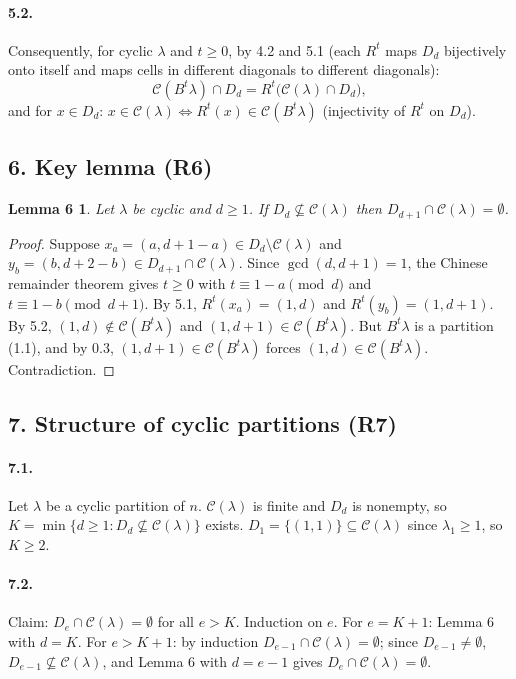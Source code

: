 \documentclass[11pt]{article}
\newtheorem*{lemmasix}{Lemma 6}
\begin{document}
\paragraph{5.2.} Consequently, for cyclic $\lambda$ and $t\ge0$, by 4.2 and 5.1 (each $R^t$ maps $D_d$
bijectively onto itself and maps cells in different diagonals to different diagonals):
\[
\mathcal C(B^t\lambda)\cap D_d=R^t\bigl(\mathcal C(\lambda)\cap D_d\bigr),
\]
and for $x\in D_d$: $x\in\mathcal C(\lambda)\iff R^t(x)\in\mathcal C(B^t\lambda)$ (injectivity of $R^t$ on $D_d$).

\subsection*{6. Key lemma (R6)}

\begin{lemmasix}
Let $\lambda$ be cyclic and $d\ge1$. If $D_d\not\subseteq\mathcal C(\lambda)$ then
$D_{d+1}\cap\mathcal C(\lambda)=\emptyset$.
\end{lemmasix}

\begin{proof}
Suppose $x_a=(a,d+1-a)\in D_d\setminus\mathcal C(\lambda)$ and $y_b=(b,d+2-b)\in D_{d+1}\cap\mathcal C(\lambda)$.
Since $\gcd(d,d+1)=1$, the Chinese remainder theorem gives $t\ge0$ with $t\equiv1-a\pmod d$ and
$t\equiv1-b\pmod{d+1}$. By 5.1, $R^t(x_a)=(1,d)$ and $R^t(y_b)=(1,d+1)$. By 5.2,
$(1,d)\notin\mathcal C(B^t\lambda)$ and $(1,d+1)\in\mathcal C(B^t\lambda)$. But $B^t\lambda$ is a partition (1.1),
and by 0.3, $(1,d+1)\in\mathcal C(B^t\lambda)$ forces $(1,d)\in\mathcal C(B^t\lambda)$. Contradiction.
\end{proof}

\subsection*{7. Structure of cyclic partitions (R7)}

\paragraph{7.1.} Let $\lambda$ be a cyclic partition of $n$. $\mathcal C(\lambda)$ is finite and $D_d$ is
nonempty, so $K=\min\{d\ge1: D_d\not\subseteq\mathcal C(\lambda)\}$ exists. $D_1=\{(1,1)\}\subseteq\mathcal C(\lambda)$
since $\lambda_1\ge1$, so $K\ge2$.

\paragraph{7.2.} Claim: $D_e\cap\mathcal C(\lambda)=\emptyset$ for all $e>K$. Induction on $e$. For $e=K+1$:
Lemma 6 with $d=K$. For $e>K+1$: by induction $D_{e-1}\cap\mathcal C(\lambda)=\emptyset$; since
$D_{e-1}\neq\emptyset$, $D_{e-1}\not\subseteq\mathcal C(\lambda)$, and Lemma 6 with $d=e-1$ gives
$D_e\cap\mathcal C(\lambda)=\emptyset$.
\end{document}
